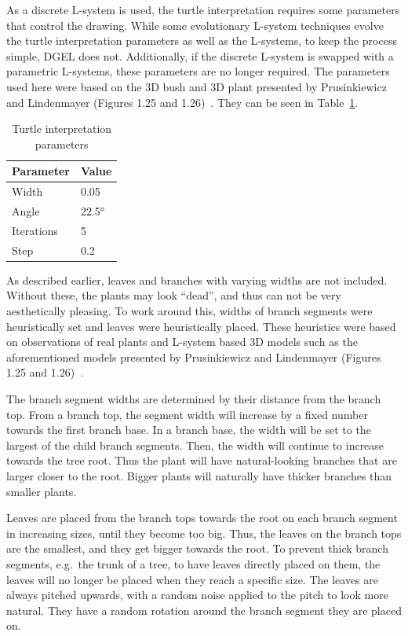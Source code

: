 As a discrete L-system is used, the turtle interpretation requires some parameters that control the drawing.
While some evolutionary L-system techniques evolve the turtle interpretation parameters as well as the L-systems, to keep the process simple, DGEL does not.
Additionally, if the discrete L-system is swapped with a parametric L-systems, these parameters are no longer required.
The parameters used here were based on the 3D bush and 3D plant presented by Prusinkiewicz and Lindenmayer (Figures 1.25 and 1.26)~\cite{2012Prusinkiewicz}.
They can be seen in Table~\ref{tab:turtle-param}.

\begin{table}
    \centering
    \begin{tabular}{| l | l |}
    \hline
    \textbf{Parameter} & \textbf{Value} \\ \hline
    Width & 0.05 \\ \hline
    Angle & 22.5° \\ \hline
    Iterations & 5 \\ \hline
    Step & 0.2 \\
    \hline
    \end{tabular}
    \caption{Turtle interpretation parameters}
    \label{tab:turtle-param}
\end{table}

As described earlier, leaves and branches with varying widths are not included.
Without these, the plants may look ``dead'', and thus can not be very aesthetically pleasing.
To work around this, widths of branch segments were heuristically set and leaves were heuristically placed.
These heuristics were based on observations of real plants and L-system based 3D models such as the aforementioned models presented by Prusinkiewicz and Lindenmayer (Figures 1.25 and 1.26)~\cite{2012Prusinkiewicz}.

The branch segment widths are determined by their distance from the branch top.
From a branch top, the segment width will increase by a fixed number towards the first branch base.
In a branch base, the width will be set to the largest of the child branch segments.
Then, the width will continue to increase towards the tree root.
Thus the plant will have natural-looking branches that are larger closer to the root.
Bigger plants will naturally have thicker branches than smaller plants.

Leaves are placed from the branch tops towards the root on each branch segment in increasing sizes, until they become too big.
Thus, the leaves on the branch tops are the smallest, and they get bigger towards the root.
To prevent thick branch segments, e.g.\ the trunk of a tree, to have leaves directly placed on them, the leaves will no longer be placed when they reach a specific size.
The leaves are always pitched upwards, with a random noise applied to the pitch to look more natural.
They have a random rotation around the branch segment they are placed on.

